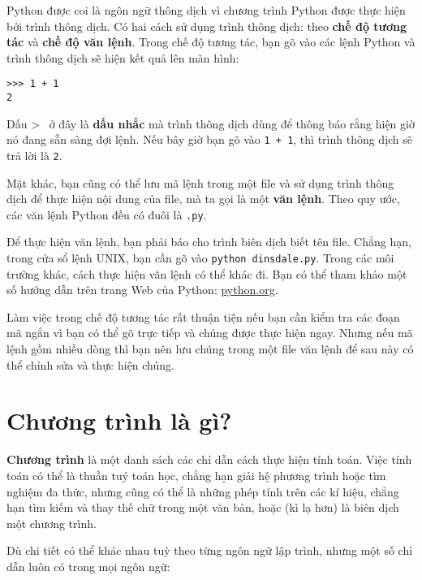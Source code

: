 \documentclass[11pt]{book}
\begin{document}
Python được coi là ngôn ngữ thông dịch vì chương trình Python được thực
hiện bởi trình thông dịch. Có hai cách sử dụng trình thông dịch: theo \textbf
{chế độ tương tác} và \textbf{chế độ văn lệnh}. Trong chế độ tương tác, bạn
gõ vào các lệnh Python và trình thông dịch sẽ hiện kết quả lên màn hình:


\beforeverb
\begin{verbatim}
>>> 1 + 1
2
\end{verbatim}
\afterverb
%
Dấu \verb >>> \ ở đây là {\bf dấu nhắc} mà trình thông dịch dùng để thông báo 
rằng hiện giờ nó đang sẵn sàng đợi lệnh. Nếu bây giờ bạn gõ vào {\tt 1 + 1}, 
thì trình thông dịch sẽ trả lời là {\tt 2}.


Mặt khác, bạn cũng có thể lưu mã lệnh trong một file và sử dụng trình
thông dịch để thực hiện nội dung của file, mà ta gọi là một {\bf văn lệnh}.
Theo quy ước, các văn lệnh Python đều có đuôi là {\tt .py}.


Để thực hiện văn lệnh, bạn phải báo cho trình biên dịch biết tên file.
Chẳng hạn, trong cửa sổ lệnh UNIX, bạn cần gõ vào {\tt python
dinsdale.py}.  Trong các môi trường khác, cách thực hiện văn lệnh
có thể khác đi. Bạn có thể tham khảo một số hướng dẫn trên trang
Web của Python: \url{python.org}.


Làm việc trong chế độ tương tác rất thuận tiện nếu bạn cần kiểm tra
các đoạn mã ngắn vì bạn có thể gõ trực tiếp và chúng được thực hiện
ngay. Nhưng nếu mã lệnh gồm nhiều dòng thì bạn nên lưu chúng trong
một file văn lệnh để  sau này có thể chỉnh sửa và thực hiện chúng.

\section{Chương trình là gì?}

{\bf Chương trình} là một danh sách các chỉ dẫn cách thực hiện tính toán.
Việc tính toán có thể là thuần tuý toán học, chẳng hạn giải hệ phương
trình hoặc tìm nghiệm đa thức, nhưng cũng có thể là những phép tính trên 
các kí hiệu, chẳng hạn tìm kiếm và thay thế chữ trong một văn bản, hoặc
(kì lạ hơn) là biên dịch một chương trình.


Dù chi tiết có thể khác nhau tuỳ theo từng ngôn ngữ lập trình, nhưng
một số chỉ dẫn luôn có trong mọi ngôn ngữ:
\end{document}
